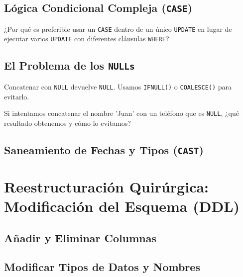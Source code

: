 \documentclass[12pt,a4paper]{article}
\begin{document}
\subsection{Lógica Condicional Compleja (\texttt{CASE})}


\begin{tcolorbox}[title=Reflexión 4]
¿Por qué es preferible usar un \texttt{CASE} dentro de un único \texttt{UPDATE} en lugar de ejecutar varios \texttt{UPDATE} con diferentes cláusulas \texttt{WHERE}?
\end{tcolorbox}

\subsection{El Problema de los \texttt{NULLs}}
Concatenar con \texttt{NULL} devuelve \texttt{NULL}. Usamos \texttt{IFNULL()} o \texttt{COALESCE()} para evitarlo.



\begin{tcolorbox}[title=Reflexión 5]
Si intentamos concatenar el nombre 'Juan' con un teléfono que es \texttt{NULL}, ¿qué resultado obtenemos y cómo lo evitamos?
\end{tcolorbox}

\subsection{Saneamiento de Fechas y Tipos (\texttt{CAST})}


\section{Reestructuración Quirúrgica: Modificación del Esquema (DDL)}
\subsection{Añadir y Eliminar Columnas}


\subsection{Modificar Tipos de Datos y Nombres}

\end{document}
